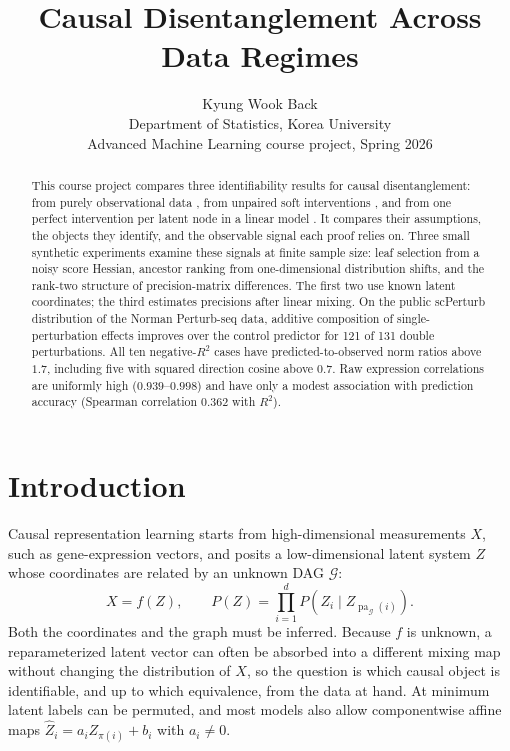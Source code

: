 \documentclass{article}
\title{Causal Disentanglement Across Data Regimes}
\author{%
  Kyung Wook Back\\
  Department of Statistics, Korea University\\[0.5em]
  \normalfont Advanced Machine Learning course project, Spring 2026
}
\newcommand{\pa}{\operatorname{pa}}
\begin{document}
\maketitle

\begin{abstract}
This course project compares three identifiability results for causal disentanglement: from purely observational data \citep{welch2024observational}, from unpaired soft interventions \citep{zhang2023soft}, and from one perfect intervention per latent node in a linear model \citep{squires2023linear}. It compares their assumptions, the objects they identify, and the observable signal each proof relies on. Three small synthetic experiments examine these signals at finite sample size: leaf selection from a noisy score Hessian, ancestor ranking from one-dimensional distribution shifts, and the rank-two structure of precision-matrix differences. The first two use known latent coordinates; the third estimates precisions after linear mixing. On the public scPerturb distribution of the Norman Perturb-seq data, additive composition of single-perturbation effects improves over the control predictor for 121 of 131 double perturbations. All ten negative-$R^2$ cases have predicted-to-observed norm ratios above $1.7$, including five with squared direction cosine above $0.7$. Raw expression correlations are uniformly high ($0.939$--$0.998$) and have only a modest association with prediction accuracy (Spearman correlation $0.362$ with $R^2$).
\end{abstract}

\section{Introduction}

Causal representation learning starts from high-dimensional measurements $X$, such as gene-expression vectors, and posits a low-dimensional latent system $Z$ whose coordinates are related by an unknown DAG $\mathcal G$:
\begin{equation}
    X=f(Z),
    \qquad
    P(Z)=\prod_{i=1}^{d} P\!\left(Z_i\mid Z_{\pa_{\mathcal G}(i)}\right).
    \label{eq:common-setup}
\end{equation}
Both the coordinates and the graph must be inferred. Because $f$ is unknown, a reparameterized latent vector can often be absorbed into a different mixing map without changing the distribution of $X$, so the question is which causal object is identifiable, and up to which equivalence, from the data at hand. At minimum latent labels can be permuted, and most models also allow componentwise affine maps $\widehat Z_i=a_iZ_{\pi(i)}+b_i$ with $a_i\neq0$.
\end{document}
